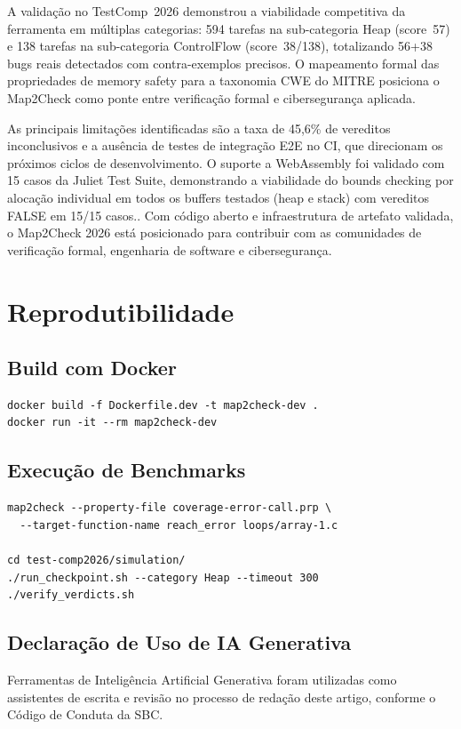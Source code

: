 \documentclass[12pt]{article}
\newcommand{\TotalTasks}{594}
\newcommand{\ScoreTestComp}{57}
\newcommand{\CountFalse}{56}
\newcommand{\PctUnknown}{45,6}
\newcommand{\WasmCases}{15}
\newcommand{\TotalCF}{138}
\newcommand{\ScoreCF}{38}
\newcommand{\CountFalseCF}{38}
\begin{document}
A validação no TestComp~2026 demonstrou a viabilidade competitiva da ferramenta em múltiplas categorias: \TotalTasks{} tarefas na sub-categoria Heap (score~\ScoreTestComp{}) e \TotalCF{} tarefas na sub-categoria ControlFlow (score~\ScoreCF/\TotalCF{}), totalizando \CountFalse+\CountFalseCF{} bugs reais detectados com contra-exemplos precisos. O mapeamento formal das propriedades de memory safety para a taxonomia CWE do MITRE posiciona o Map2Check como ponte entre verificação formal e cibersegurança aplicada.

As principais limitações identificadas são a taxa de \PctUnknown\% de vereditos inconclusivos e a ausência de testes de integração E2E no CI, que direcionam os próximos ciclos de desenvolvimento. O suporte a WebAssembly foi validado com \WasmCases{} casos da Juliet Test Suite, demonstrando a viabilidade do bounds checking por alocação individual em todos os buffers testados (heap e stack) com vereditos FALSE em \WasmCases/\WasmCases{} casos.. Com código aberto e infraestrutura de artefato validada, o Map2Check 2026 está posicionado para contribuir com as comunidades de verificação formal, engenharia de software e cibersegurança.

\section{Reprodutibilidade}
\label{ap:repro}

\subsection{Build com Docker}

\begin{verbatim}
docker build -f Dockerfile.dev -t map2check-dev .
docker run -it --rm map2check-dev
\end{verbatim}

\subsection{Execução de Benchmarks}

\begin{verbatim}
map2check --property-file coverage-error-call.prp \
  --target-function-name reach_error loops/array-1.c

cd test-comp2026/simulation/
./run_checkpoint.sh --category Heap --timeout 300
./verify_verdicts.sh
\end{verbatim}

\subsection{Declaração de Uso de IA Generativa}
\label{ap:ia}

Ferramentas de Inteligência Artificial Generativa foram utilizadas
como assistentes de escrita e revisão no processo de redação deste
artigo, conforme o Código de Conduta da SBC.



\newpage
\appendix
\end{document}
